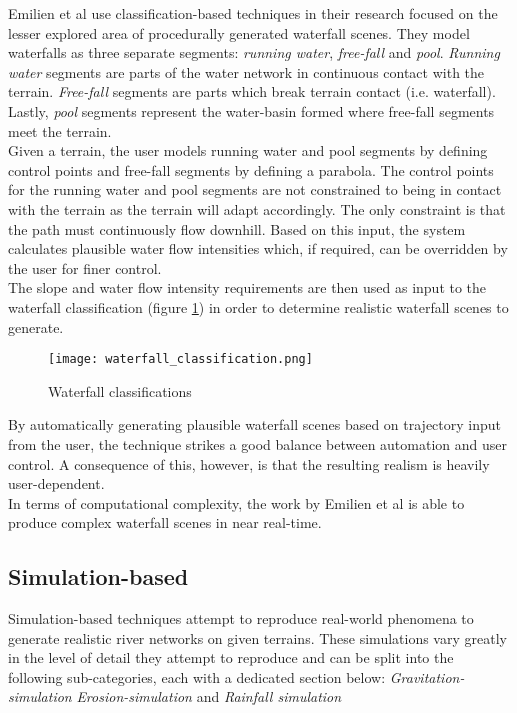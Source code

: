 Emilien et al \cite{Emilien2014} use classification-based techniques in their research focused on the lesser explored area of procedurally generated waterfall scenes. They model waterfalls as three separate segments: \textit{running water}, \textit{free-fall} and \textit{pool}. \textit{Running water} segments are parts of the water network in continuous contact with the terrain. \textit{Free-fall} segments are parts which break terrain contact (i.e. waterfall). Lastly, \textit{pool} segments represent the water-basin formed where free-fall segments meet the terrain. \\
Given a terrain, the user models running water and pool segments by defining control points and free-fall segments by defining a parabola. The control points for the running water and pool segments are not constrained to being in contact with the terrain as the terrain will adapt accordingly. The only constraint is that the path must continuously flow downhill. Based on this input, the system calculates plausible water flow intensities which, if required, can be overridden by the user for finer control.\\
The slope and water flow intensity requirements are then used as input to the waterfall classification (figure \ref{Waterfall classifications}) in order to determine realistic waterfall scenes to generate.\\

\begin{figure}[h]
  \centering
	\label{Waterfall classifications}
	\texttt{[image: waterfall\_classification.png]}
	\caption{Waterfall classifications \cite{Emilien2014}}
\end{figure}

By automatically generating plausible waterfall scenes based on trajectory input from the user, the technique strikes a good balance between automation and user control. A consequence of this, however, is that the resulting realism is heavily user-dependent. \\ 
In terms of computational complexity, the work by Emilien et al \cite{Emilien2014} is able to produce complex waterfall scenes in near real-time.

\subsection{Simulation-based}

Simulation-based techniques attempt to reproduce real-world phenomena to generate realistic river networks on given terrains. These simulations vary greatly in the level of detail they attempt to reproduce and can be split into the following sub-categories, each with a dedicated section below: \textit{Gravitation-simulation} \textit{Erosion-simulation} and \textit{Rainfall simulation} \\

